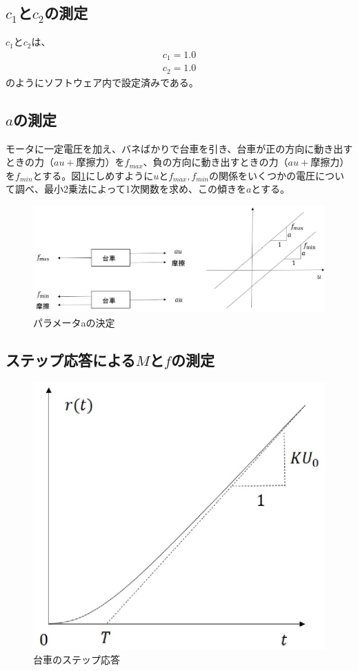 \documentclass[a4j,11pt,twoside]{ujbook}
\begin{document}
	\subsection{$c_1$と$c_2$の測定}
	$c_1$と$c_2$は、
	\begin{eqnarray*}
		c_1 = 1.0\\
		c_2 = 1.0
	\end{eqnarray*}
	のようにソフトウェア内で設定済みである。

	\subsection{$a$の測定}
	モータに一定電圧を加え、バネばかりで台車を引き、台車が正の方向に動き出すときの力（$au+摩擦力$）を$f_{max}$、負の方向に動き出すときの力（$au+摩擦力$）を$f_{min}$とする。図\ref{fig:パラメータaの決定}にしめすように$u$と$f_{max},f_{min}$の関係をいくつかの電圧について調べ、最小2乗法によって1次関数を求め、この傾きを$a$とする。


	\begin{figure}[htbp]
		\begin{center}
			\includegraphics[width = 0.8 \linewidth]{a.eps}
			\caption{パラメータaの決定}
			\label{fig:パラメータaの決定}
		\end{center}
	\end{figure}

	\subsection{ステップ応答による$M$と$f$の測定}

	\begin{figure}[htbp]
		\begin{center}
			\includegraphics[width = 0.6 \linewidth]{step.eps}
			\caption{台車のステップ応答}
			\label{fig:台車のステップ応答}
		\end{center}
	\end{figure}
\end{document}
